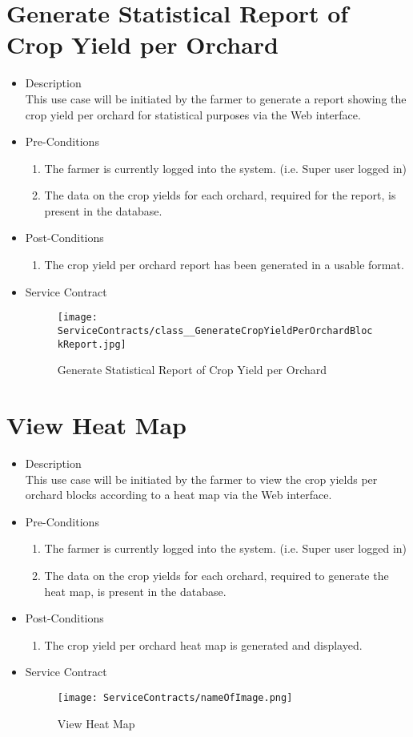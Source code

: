 \documentclass[11pt,fleqn]{book} %
\begin{document}
\section{Generate Statistical Report of Crop Yield per Orchard}
\begin{itemize}
	\item Description\\
	This use case will be initiated by the farmer to generate a report showing the crop yield per orchard for statistical purposes via the Web interface.
	\item Pre-Conditions
	\begin{enumerate}
		\item The farmer is currently logged into the system. (i.e. Super user logged in)
		\item The data on the crop yields for each orchard, required for the report, is present in the database.									
	\end{enumerate}
	\item Post-Conditions
	\begin{enumerate}
		\item The crop yield per orchard report has been generated in a usable format.
	\end{enumerate}
	\item Service Contract
	\begin{figure}
		\texttt{[image: ServiceContracts/class\_\_GenerateCropYieldPerOrchardBlockReport.jpg]}
		\caption{Generate Statistical Report of Crop Yield per Orchard}
	\end{figure}
\end{itemize}

\section{View Heat Map}
\begin{itemize}
	\item Description\\
	This use case will be initiated by the farmer to view the crop yields per orchard blocks according to a heat map via the Web interface.
	\item Pre-Conditions
	\begin{enumerate}
		\item The farmer is currently logged into the system. (i.e. Super user logged in)
		\item The data on the crop yields for each orchard, required to generate the heat map, is present in the database.	
	\end{enumerate}
	\item Post-Conditions
	\begin{enumerate}
		\item The crop yield per orchard heat map is generated and displayed.
	\end{enumerate}
	\item Service Contract
	\begin{figure}
		\texttt{[image: ServiceContracts/nameOfImage.png]}
		\caption{View Heat Map}
	\end{figure}
\end{itemize}
\end{document}
